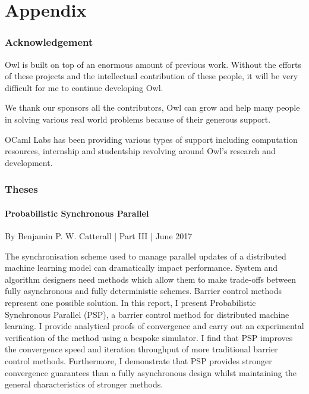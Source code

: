\part{Appendix}

\newpage



\hypertarget{Acknowledgement}{%
\section{Acknowledgement}\label{acknowledgement}}

Owl is built on top of an enormous amount of previous work. Without the efforts of these projects and the intellectual contribution of these people, it will be very difficult for me to continue developing Owl.

We thank our sponsors all the contributors, Owl can grow and help many people in solving various real world problems because of their generous support.

OCaml Labs has been providing various types of support including computation resources, internship and studentship revolving around Owl’s research and development.



\newpage



\hypertarget{Theses}{%
\section{Theses}\label{theses}}

\hypertarget{Probabilistic Synchronous Parallel}{%
\subsection{Probabilistic Synchronous Parallel}\label{theses-psp}}

By Benjamin P. W. Catterall | Part III | June 2017

The synchronisation scheme used to manage parallel updates of a distributed machine learning model can dramatically impact performance. System and algorithm designers need methods which allow them to make trade-offs between fully asynchronous and fully deterministic schemes. Barrier control methods represent one possible solution. In this report, I present Probabilistic Synchronous Parallel (PSP), a barrier control method for distributed machine learning. I provide analytical proofs of convergence and carry out an experimental verification of the method using a bespoke simulator. I find that PSP improves the convergence speed and iteration throughput of more traditional barrier control methods. Furthermore, I demonstrate that PSP provides stronger convergence guarantees than a fully asynchronous design whilst maintaining the general characteristics of stronger methods.


